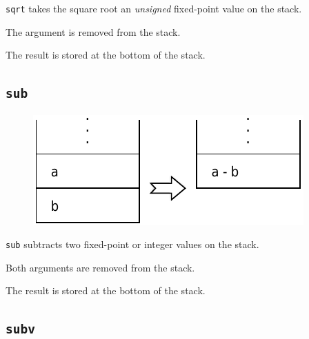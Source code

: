			\texttt{sqrt} takes the square root an \emph{unsigned} fixed-point
			value on the stack.
			
			The argument is removed from the stack.
			
			The result is stored at the bottom of the stack.
	
	\qquad
	
	\subsection*{\texttt{sub}}
	
		\begin{figure}
			\begin{flushright}
				\includegraphics[width=\linewidth]{figure/pdf/i_sub} 
			\end{flushright}
		\end{figure}
	
			\texttt{sub} subtracts two fixed-point or integer values on the
			stack.
			
			Both arguments are removed from the stack.
			
			The result is stored at the bottom of the stack.
	
	\qquad
	
	\subsection*{\texttt{subv}}
	
